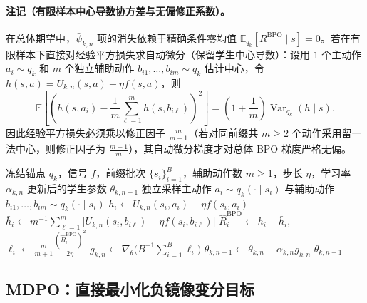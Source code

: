 \documentclass[lang=cn,scheme=chinese,openany]{elegantbook}
\begin{document}
\paragraph{注记（有限样本中心导数协方差与无偏修正系数）。}
在总体期望中，$\bar\psi_{k,n}$ 项的消失依赖于精确条件零均值 $\mathbb E_{q_k}[R^{\mathrm{BPO}}\mid s]=0$。若在有限样本下直接对经验平方损失求自动微分（保留学生中心导数）：设用 $1$ 个主动作 $a_i\sim q_k$ 和 $m$ 个独立辅助动作 $b_{i1},\ldots,b_{im}\sim q_k$ 估计中心，令 $h(s,a)=U_{k,n}(s,a)-\eta f(s,a)$，则
\begin{equation*}
\mathbb E\left[\left(h(s,a_i)-\frac1m\sum_{\ell=1}^m h(s,b_{i\ell})\right)^2\right]
=\left(1+\frac1m\right)\operatorname{Var}_{ q_k}(h\mid s).
\end{equation*}
因此经验平方损失必须乘以修正因子 $\frac{m}{m+1}$（若对同前缀共 $m\ge 2$ 个动作采用留一法中心，则修正因子为 $\frac{m-1}{m}$），其自动微分梯度才对总体 BPO 梯度严格无偏。

\begin{algorithm}[ht]
\caption{BPO 内层更新\\{\small\textit{数学语义：固定锚点下对中心化完整残差求平方损失}}}
\begin{algorithmic}[1]
\Require 冻结锚点 $q_k$，信号 $f$，前缀批次 $\{s_i\}_{i=1}^{B}$，辅助动作数 $m\ge1$，步长 $\eta$，学习率 $\alpha_{k,n}$
\Ensure 更新后的学生参数 $\theta_{k,n+1}$
    \State 独立采样主动作 $a_i\sim q_k(\cdot\mid s_i)$ 与辅助动作 $b_{i1},\ldots,b_{im}\sim q_k(\cdot\mid s_i)$
    \State $h_i\gets U_{k,n}(s_i,a_i)-\eta f(s_i,a_i)$
    \State $\bar h_i\gets m^{-1}\sum_{\ell=1}^{m}\bigl[U_{k,n}(s_i,b_{i\ell})-\eta f(s_i,b_{i\ell})\bigr]$
    \State $\widehat R_i^{\mathrm{BPO}}\gets h_i-\bar h_i$, \quad $\ell_i\gets\frac{m}{m+1}\frac{(\widehat R_i^{\mathrm{BPO}})^2}{2\eta}$
\EndFor
\State $g_{k,n}\gets\nabla_\theta\bigl(B^{-1}\sum_{i=1}^B\ell_i\bigr)$
\State $\theta_{k,n+1}\gets\theta_{k,n}-\alpha_{k,n}g_{k,n}$
\State \Return $\theta_{k,n+1}$
\end{algorithmic}
\end{algorithm}

\subsection{MDPO：直接最小化负镜像变分目标}
\label{subsec:ch2-mdpo-loss-derivation}
\label{sec:ch2-mdpo-generic}
\end{document}

